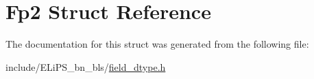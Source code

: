 \hypertarget{struct_fp2}{}\section{Fp2 Struct Reference}
\label{struct_fp2}


The documentation for this struct was generated from the following file\+:\begin{DoxyCompactItemize}
\item 
include/\+E\+Li\+P\+S\+\_\+bn\+\_\+bls/\hyperlink{field__dtype_8h}{field\+\_\+dtype.\+h}\end{DoxyCompactItemize}
